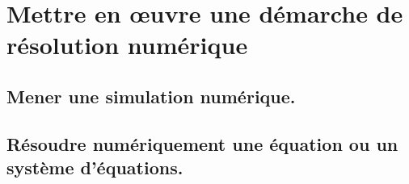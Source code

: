 \documentclass[10pt,fleqn]{book}
\newcommand{\repRel}{../..}
\newcommand{\repStyle}{\repRel/Style}
\newcommand{\td}{fichier_td}
\newcommand{\repExos}{\repRel/ExercicesCompetences}
\newcommand{\repExo}{dossier}
\begin{document}
\begin{multicols}{2}
\renewcommand{\repExo}{\repExos/C2_MettreEnOeuvreDemarche/C2_09_DeterminerLoiMouvement_TEC/19_Graham}
\renewcommand{\td}{19_Graham}
\graphicspath{{\repStyle/png/}{\repExo/images/}}


\renewcommand{\repExo}{\repExos/C2_MettreEnOeuvreDemarche/C2_09_DeterminerLoiMouvement_TEC/20_VariateurBilles}
\renewcommand{\td}{20_VariateurBilles}
\graphicspath{{\repStyle/png/}{\repExo/images/}}


\renewcommand{\repExo}{\repExos/C2_MettreEnOeuvreDemarche/C2_09_DeterminerLoiMouvement_TEC/49_ElevateurBateaux}
\renewcommand{\td}{49_ElevateurBateaux}
\graphicspath{{\repStyle/png/}{\repExo/images/}}


\renewcommand{\repExo}{\repExos/C2_MettreEnOeuvreDemarche/C2_09_DeterminerLoiMouvement_TEC/50_BancBalafre}
\renewcommand{\td}{50_BancBalafre}
\graphicspath{{\repStyle/png/}{\repExo/images/}}


\renewcommand{\repExo}{\repExos/C2_MettreEnOeuvreDemarche/C2_09_DeterminerLoiMouvement_TEC/64_EPAS}
\renewcommand{\td}{64_EPAS}
\graphicspath{{\repStyle/png/}{\repExo/images/}}


\end{multicols}

\section{Mettre en œuvre une démarche de résolution numérique} 

\subsection{Mener une simulation numérique. } 

\begin{multicols}{2} 

\end{multicols}

\subsection{Résoudre numériquement une équation ou un système d'équations. } 

\begin{multicols}{2} 

\renewcommand{\repExo}{\repExos/C3_ResolutionNumerique/C3_02_Euler/1021_Euler}
\renewcommand{\td}{1021_Euler}
\graphicspath{{\repStyle/png/}{\repExo/images/}}


\renewcommand{\repExo}{\repExos/C3_ResolutionNumerique/C3_02_Euler/1022_Euler}
\renewcommand{\td}{1022_Euler}
\graphicspath{{\repStyle/png/}{\repExo/images/}}


\renewcommand{\repExo}{\repExos/C3_ResolutionNumerique/C3_02_Euler/1023_Euler}
\renewcommand{\td}{1023_Euler}
\graphicspath{{\repStyle/png/}{\repExo/images/}}


\end{multicols}
\end{document}
